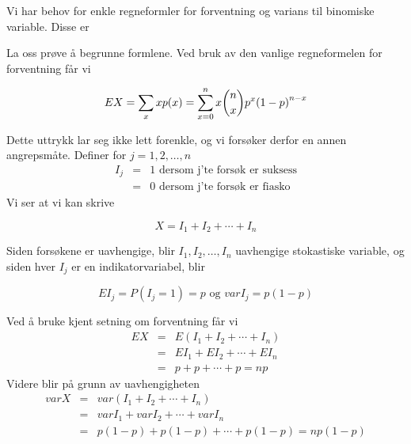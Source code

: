 \begin{center}  \end{center}

\noindent Vi har behov for enkle regneformler for forventning og
varians til binomiske variable. Disse er
\begin{center}  \end{center}

\noindent La oss prøve å begrunne formlene. Ved bruk av den vanlige
regneformelen for forventning får vi

\[ EX=\sum_x xp(x)=\sum_{x=0}^n x {{n}\choose{x}}p^x{(1-p)}^{n-x} \]

\noindent Dette uttrykk lar seg ikke lett forenkle, og vi forsøker derfor
en annen angrepsmåte. Definer for $j=1, 2, \ldots , n$
\begin{eqnarray*}
     I_j&=&1 \mbox{\ \ dersom j'te forsøk er suksess} \\
        &=&0 \mbox{\ \ dersom j'te forsøk er fiasko}
\end{eqnarray*}
\noindent Vi ser at vi kan skrive

\[     X=I_1+I_2+ \cdots +I_n \]

\noindent Siden forsøkene er uavhengige, blir $I_1, I_2, \ldots , I_n$
uavhengige stokastiske variable, og siden hver $I_j$ er en
indikatorvariabel, blir

\[ EI_j=P(I_j=1)=p \mbox{\ \ og \ \ } var I_j=p(1-p) \]

\noindent Ved å bruke kjent setning om forventning får vi
\begin{eqnarray*}
     EX&=&E(I_1+I_2+\cdots +I_n) \\
       &=&EI_1+EI_2+\cdots +EI_n \\
       &=&p+p+\cdots +p=np
\end{eqnarray*}
\noindent Videre blir på grunn av uavhengigheten
\begin{eqnarray*}
     varX&=&var(I_1+I_2+\cdots +I_n)\\
         &=&varI_1+varI_2+\cdots +varI_n \\
         &=&p(1-p)+p(1-p)+\cdots +p(1-p)=np(1-p)
\end{eqnarray*}
                    
